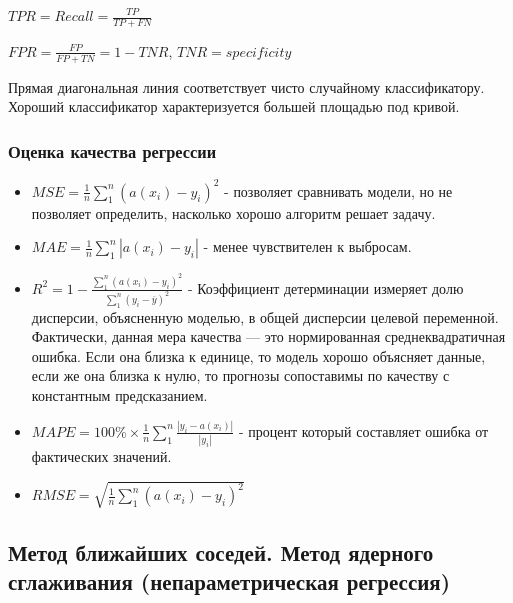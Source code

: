 \documentclass{article}
\begin{document}


$TPR = Recall = \frac{TP}{TP + FN}$

$FPR = \frac{FP}{FP + TN} = 1 - TNR$, $TNR = specificity$

Прямая диагональная линия соответствует чисто случайному классификатору.
Хороший классификатор характеризуется большей площадью под кривой.


\subsubsection{Оценка качества регрессии}

\begin{itemize}
	\item $MSE = \frac{1}{n} \sum\limits_1^n (a(x_i) - y_i)^2$ - позволяет сравнивать модели, но
	не позволяет определить, насколько хорошо алгоритм решает задачу.
	\item $MAE = \frac{1}{n} \sum\limits_1^n |a(x_i) - y_i|$ - менее чувствителен к выбросам.
	\item $R^2 = 1 - \frac{\sum\limits_1^n (a(x_i) - y_i)^2}{\sum\limits_1^n (y_i - \overline{y})^2}$ -
	Коэффициент детерминации измеряет долю дисперсии, объясненную моделью, в общей дисперсии целевой
	переменной. Фактически, данная мера качества — это нормированная среднеквадратичная ошибка. Если
	она близка к единице, то модель хорошо объясняет данные, если же она близка к нулю, то прогнозы
	сопоставимы по качеству с константным предсказанием.
	\item $MAPE = 100\% \times \frac{1}{n}\sum\limits_1^n \frac{|y_i - a(x_i)|}{|y_i|}$ - процент
	который составляет ошибка от фактических значений.
	\item $RMSE = \sqrt{\frac{1}{n} \sum\limits_1^n (a(x_i) - y_i)^2}$
\end{itemize}


\subsection{Метод ближайших соседей. Метод ядерного сглаживания (непараметрическая
регрессия)}
\end{document}
